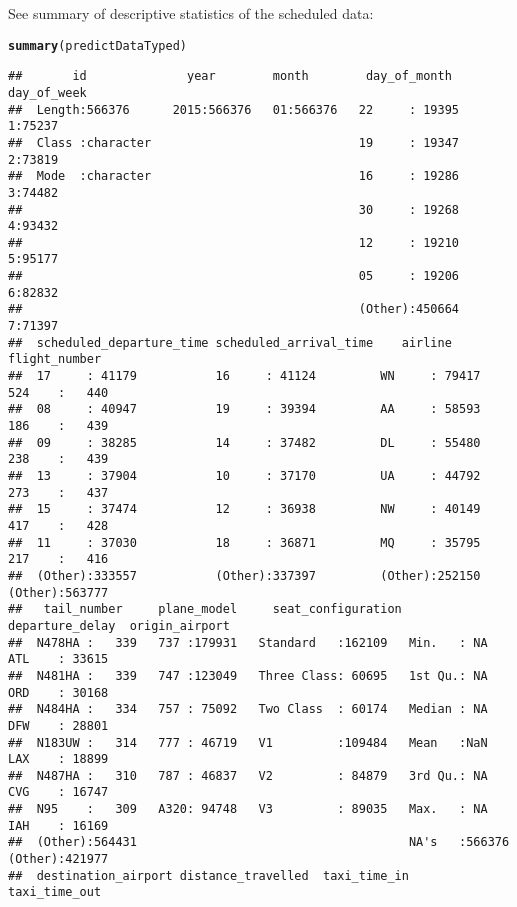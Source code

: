\documentclass{article}\usepackage[]{graphicx}\usepackage[]{color}
\makeatletter
\newcommand{\hlstd}[1]{\textcolor[rgb]{0.345,0.345,0.345}{#1}}%
\newcommand{\hlkwd}[1]{\textcolor[rgb]{0.737,0.353,0.396}{\textbf{#1}}}%
\newenvironment{kframe}{%
 \def\at@end@of@kframe{}%
 \ifinner\ifhmode%
  \def\at@end@of@kframe{\end{minipage}}%
  \begin{minipage}{\columnwidth}%
 \fi\fi%
 \def\FrameCommand##1{\hskip\@totalleftmargin \hskip-\fboxsep
 \colorbox{shadecolor}{##1}\hskip-\fboxsep
     \hskip-\linewidth \hskip-\@totalleftmargin \hskip\columnwidth}%
 \MakeFramed {\advance\hsize-\width
   \@totalleftmargin\z@ \linewidth\hsize
   \@setminipage}}%
 {\par\unskip\endMakeFramed%
 \at@end@of@kframe}
\newenvironment{knitrout}{}{} %
\makeatother
\begin{document}
\pagebreak

See summary of descriptive statistics of the scheduled data: 
\begin{knitrout}
\color{fgcolor}\begin{kframe}
\begin{alltt}
\hlkwd{summary}\hlstd{(predictDataTyped)}
\end{alltt}
\begin{verbatim}
##       id              year        month        day_of_month    day_of_week
##  Length:566376      2015:566376   01:566376   22     : 19395   1:75237    
##  Class :character                             19     : 19347   2:73819    
##  Mode  :character                             16     : 19286   3:74482    
##                                               30     : 19268   4:93432    
##                                               12     : 19210   5:95177    
##                                               05     : 19206   6:82832    
##                                               (Other):450664   7:71397    
##  scheduled_departure_time scheduled_arrival_time    airline       flight_number   
##  17     : 41179           16     : 41124         WN     : 79417   524    :   440  
##  08     : 40947           19     : 39394         AA     : 58593   186    :   439  
##  09     : 38285           14     : 37482         DL     : 55480   238    :   439  
##  13     : 37904           10     : 37170         UA     : 44792   273    :   437  
##  15     : 37474           12     : 36938         NW     : 40149   417    :   428  
##  11     : 37030           18     : 36871         MQ     : 35795   217    :   416  
##  (Other):333557           (Other):337397         (Other):252150   (Other):563777  
##   tail_number     plane_model     seat_configuration departure_delay  origin_airport  
##  N478HA :   339   737 :179931   Standard   :162109   Min.   : NA      ATL    : 33615  
##  N481HA :   339   747 :123049   Three Class: 60695   1st Qu.: NA      ORD    : 30168  
##  N484HA :   334   757 : 75092   Two Class  : 60174   Median : NA      DFW    : 28801  
##  N183UW :   314   777 : 46719   V1         :109484   Mean   :NaN      LAX    : 18899  
##  N487HA :   310   787 : 46837   V2         : 84879   3rd Qu.: NA      CVG    : 16747  
##  N95    :   309   A320: 94748   V3         : 89035   Max.   : NA      IAH    : 16169  
##  (Other):564431                                      NA's   :566376   (Other):421977  
##  destination_airport distance_travelled  taxi_time_in    taxi_time_out   

\end{verbatim}
\end{kframe}
\end{knitrout}
\end{document}
